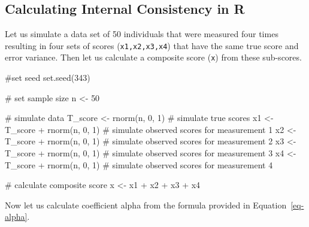 \documentclass[
  letterpaper,
  DIV=11,
  numbers=noendperiod]{scrreprt}
\newenvironment{Shaded}{\begin{snugshade}}{\end{snugshade}}
\newcommand{\CommentTok}[1]{\textcolor[rgb]{0.37,0.37,0.37}{#1}}
\newcommand{\DecValTok}[1]{\textcolor[rgb]{0.68,0.00,0.00}{#1}}
\newcommand{\FunctionTok}[1]{\textcolor[rgb]{0.28,0.35,0.67}{#1}}
\newcommand{\NormalTok}[1]{\textcolor[rgb]{0.00,0.23,0.31}{#1}}
\newcommand{\OtherTok}[1]{\textcolor[rgb]{0.00,0.23,0.31}{#1}}
\newcommand{\SpecialCharTok}[1]{\textcolor[rgb]{0.37,0.37,0.37}{#1}}
\begin{document}
\hypertarget{calculating-internal-consistency-in-r}{%
\subsection{Calculating Internal Consistency in
R}\label{calculating-internal-consistency-in-r}}

Let us simulate a data set of 50 individuals that were measured four
times resulting in four sets of scores (\texttt{x1,x2,x3,x4}) that have
the same true score and error variance. Then let us calculate a
composite score (\texttt{x}) from these sub-scores.

\begin{Shaded}
\begin{Highlighting}[]
\CommentTok{\#set seed}
\FunctionTok{set.seed}\NormalTok{(}\DecValTok{343}\NormalTok{)}

\CommentTok{\# set sample size}
\NormalTok{n }\OtherTok{\textless{}{-}} \DecValTok{50}

\CommentTok{\# simulate data}
\NormalTok{T\_score }\OtherTok{\textless{}{-}} \FunctionTok{rnorm}\NormalTok{(n, }\DecValTok{0}\NormalTok{, }\DecValTok{1}\NormalTok{) }\CommentTok{\# simulate true scores}
\NormalTok{x1 }\OtherTok{\textless{}{-}}\NormalTok{ T\_score }\SpecialCharTok{+} \FunctionTok{rnorm}\NormalTok{(n, }\DecValTok{0}\NormalTok{, }\DecValTok{1}\NormalTok{) }\CommentTok{\# simulate observed scores for measurement 1}
\NormalTok{x2 }\OtherTok{\textless{}{-}}\NormalTok{ T\_score }\SpecialCharTok{+} \FunctionTok{rnorm}\NormalTok{(n, }\DecValTok{0}\NormalTok{, }\DecValTok{1}\NormalTok{) }\CommentTok{\# simulate observed scores for measurement 2}
\NormalTok{x3 }\OtherTok{\textless{}{-}}\NormalTok{ T\_score }\SpecialCharTok{+} \FunctionTok{rnorm}\NormalTok{(n, }\DecValTok{0}\NormalTok{, }\DecValTok{1}\NormalTok{) }\CommentTok{\# simulate observed scores for measurement 3}
\NormalTok{x4 }\OtherTok{\textless{}{-}}\NormalTok{ T\_score }\SpecialCharTok{+} \FunctionTok{rnorm}\NormalTok{(n, }\DecValTok{0}\NormalTok{, }\DecValTok{1}\NormalTok{) }\CommentTok{\# simulate observed scores for measurement 4}

\CommentTok{\# calculate composite score}
\NormalTok{x }\OtherTok{\textless{}{-}}\NormalTok{ x1 }\SpecialCharTok{+}\NormalTok{ x2 }\SpecialCharTok{+}\NormalTok{ x3 }\SpecialCharTok{+}\NormalTok{ x4}
\end{Highlighting}
\end{Shaded}

Now let us calculate coefficient alpha from the formula provided in
Equation~\ref{eq-alpha}.
\end{document}
